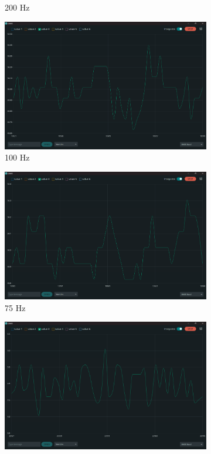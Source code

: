 \documentclass[12pt]{article}
\begin{document}
\begin{figure}[h]
\begin{subfigure}{.49\textwidth}
        \caption{200 Hz}
    \end{subfigure}
	\begin{subfigure}{.49\textwidth}
        \centering
        \includegraphics[width=0.95\linewidth]{images/q4/100Hz.png}
		\caption{100 Hz}
    \end{subfigure}
	\begin{subfigure}{.49\textwidth}
        \centering
        \includegraphics[width=0.95\linewidth]{images/q4/75Hz.png}
		\caption{75 Hz}
    \end{subfigure}
    \begin{subfigure}{.49\textwidth}
        \centering
        \includegraphics[width=0.95\linewidth]{images/q4/50Hz.png} 

\end{subfigure}
\end{figure}
\end{document}
